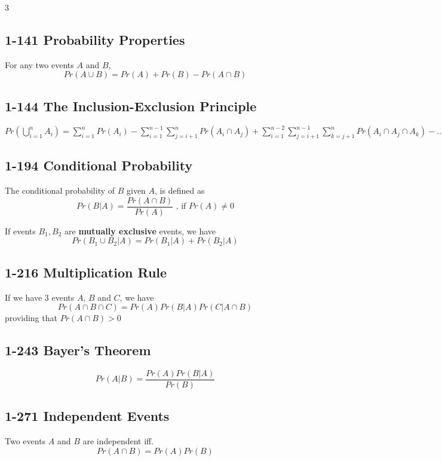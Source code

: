 \documentclass[12pt,landscape]{article}
\begin{document}
\begin{multicols}{3}
    \subsection{1-141 Probability Properties}
    For any two events $A$ and $B$,
        $$ Pr(A \cup B) = Pr(A) + Pr(B) - Pr(A \cap B) $$
    
    \subsection{1-144 The Inclusion-Exclusion Principle}
    $ Pr(\bigcup\limits_{i = 1}^{n} A_i) = \sum_{i=1}^{n} Pr(A_i) - \sum_{i=1}^{n-1} \sum_{j=i+1}^{n} Pr(A_i \cap A_j) + \sum_{i=1}^{n-2} \sum_{j=i+1}^{n-1} \sum_{k=j+1}^{n} Pr(A_i \cap A_j \cap A_k) - \dots + (-1)^{n+1} Pr(\bigcap\limits_{i = 1}^{n} A_i) $
    
    \subsection{1-194 Conditional Probability}
    The conditional probability of $B$ given $A$, is defined as
    $$ Pr(B|A) = \frac{Pr(A \cap B)}{Pr(A)} \text{ , if } Pr(A) \ne 0 $$
    
    If events $B_1, B_2$ are \textbf{mutually exclusive} events, we have
    $$ Pr(B_1 \cup B_2 | A) = Pr(B_1|A) + Pr(B_2|A) $$
    
    \subsection{1-216 Multiplication Rule}
    If we have 3 events $A$, $B$ and $C$, we have
    $$ Pr(A \cap B \cap C) = Pr(A) Pr(B|A) Pr(C|A \cap B) $$
    providing that $Pr(A \cap B) > 0$
    
    \subsection{1-243 Bayer's Theorem}
    $$ Pr(A|B) = \frac{Pr(A) Pr(B|A)}{Pr(B)} $$
    
    \subsection{1-271 Independent Events}
    Two events $A$ and $B$ are independent iff.
    $$ Pr(A \cap B) = Pr(A) Pr(B) $$
    

\end{multicols}
\end{document}
